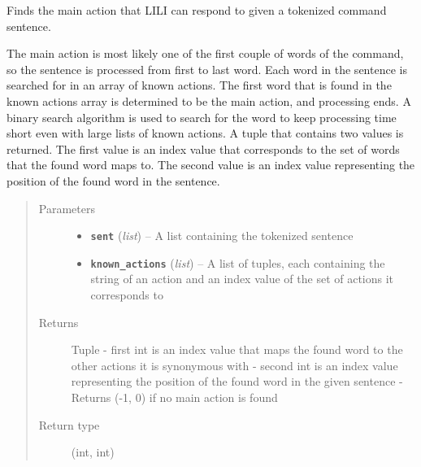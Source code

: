 \documentclass[letterpaper,10pt,english]{sphinxmanual}
\begin{document}

\begin{fulllineitems}
\label{interpreter:interpreter.interpreter.extract_action}
Finds the main action that LILI can respond to given a tokenized command sentence.

The main action is most likely one of the first couple of words of the command, so the sentence is processed from first to last word. Each word in the sentence is searched for in an array of known actions. The first word that is found in the known actions array is determined to be the main action, and processing ends. A binary search algorithm is used to search for the word to keep processing time short even with large lists of known actions. A tuple that contains two values is returned. The first value is an index value that corresponds to the set of words that the found word maps to. The second value is an index value representing the position of the found word in the sentence.
\begin{quote}\begin{description}
\item[{Parameters}] \leavevmode\begin{itemize}
\item {} 
\textbf{\texttt{sent}} (\emph{list}) -- A list containing the tokenized sentence

\item {} 
\textbf{\texttt{known\_actions}} (\emph{list}) -- A list of tuples, each containing the string of an action and an index value of the set of actions it corresponds to

\end{itemize}

\item[{Returns}] \leavevmode
Tuple - first int is an index value that maps the found word to the other actions it is synonymous with - second int is an index value representing the position of the found word in the given sentence - Returns (-1, 0) if no main action is found

\item[{Return type}] \leavevmode
(int, int)

\end{description}\end{quote}

\end{fulllineitems}
\end{document}
